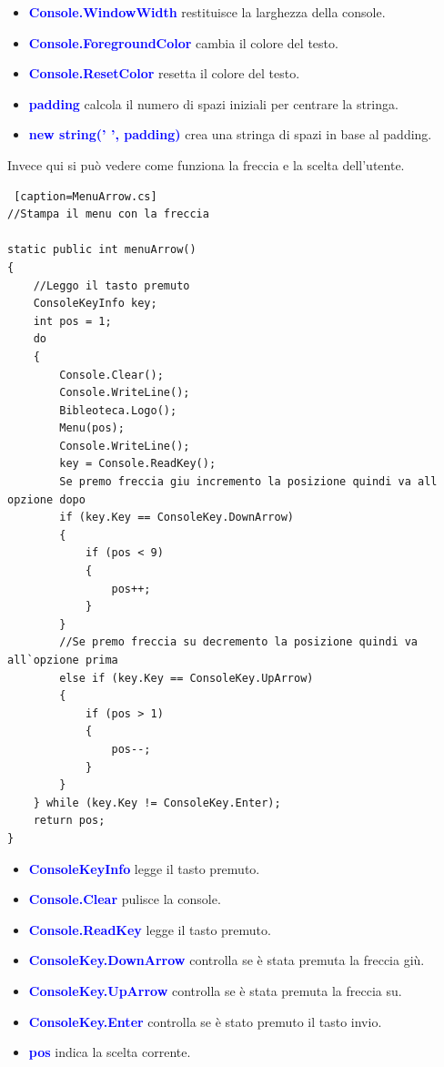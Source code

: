 \documentclass[a4paper,12pt]{article}
\begin{document}
\begin{itemize}
    \item \textcolor{blue}{\textbf{Console.WindowWidth}} restituisce la larghezza della console.
    \item \textcolor{blue}{\textbf{Console.ForegroundColor}} cambia il colore del testo.
    \item \textcolor{blue}{\textbf{Console.ResetColor}} resetta il colore del testo.
    \item \textcolor{blue}{\textbf{padding}} calcola il numero di spazi iniziali per centrare la stringa.
    \item \textcolor{blue}{\textbf{new string(' ', padding)}} crea una stringa di spazi in base al padding.
\end{itemize}



\newpage

Invece qui si può vedere come funziona la freccia e la scelta dell'utente.

\begin{lstlisting} [caption=MenuArrow.cs]
//Stampa il menu con la freccia

static public int menuArrow()
{
    //Leggo il tasto premuto
    ConsoleKeyInfo key;
    int pos = 1;
    do
    {
        Console.Clear();
        Console.WriteLine();
        Bibleoteca.Logo();
        Menu(pos);
        Console.WriteLine();
        key = Console.ReadKey();
        Se premo freccia giu incremento la posizione quindi va all opzione dopo
        if (key.Key == ConsoleKey.DownArrow)
        {
            if (pos < 9)
            {
                pos++;
            }
        }
        //Se premo freccia su decremento la posizione quindi va all`opzione prima
        else if (key.Key == ConsoleKey.UpArrow)
        {
            if (pos > 1)
            {
                pos--;
            }
        }
    } while (key.Key != ConsoleKey.Enter);
    return pos;
}
\end{lstlisting}

\begin{itemize}
    \item \textcolor{blue}{\textbf{ConsoleKeyInfo}} legge il tasto premuto.
    \item \textcolor{blue}{\textbf{Console.Clear}} pulisce la console.
    \item \textcolor{blue}{\textbf{Console.ReadKey}} legge il tasto premuto.
    \item \textcolor{blue}{\textbf{ConsoleKey.DownArrow}} controlla se è stata premuta la freccia giù.
    \item \textcolor{blue}{\textbf{ConsoleKey.UpArrow}} controlla se è stata premuta la freccia su.
    \item \textcolor{blue}{\textbf{ConsoleKey.Enter}} controlla se è stato premuto il tasto invio.
    \item \textcolor{blue}{\textbf{pos}} indica la scelta corrente.
\end{itemize}
\end{document}
